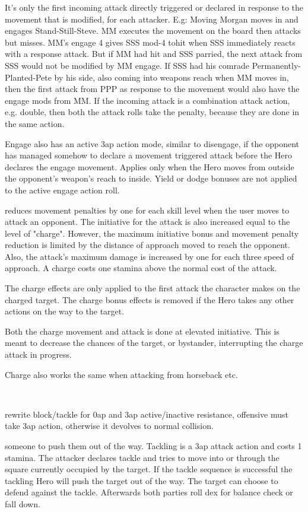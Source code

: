 It's only the first incoming attack directly triggered or declared in response to the movement that is modified, for each attacker.
E.g: Moving Morgan moves in and engages Stand-Still-Steve. MM executes the movement on the board then attacks but misses. MM's engage 4 gives SSS mod-4 tohit when SSS immediately reacts with a response attack. But if MM had hit and SSS parried, the next attack from SSS would not be modified by MM engage.
If SSS had his comrade Permanently-Planted-Pete by his side, also coming into weapons reach when MM moves in, then the first attack from PPP as response to the movement would also have the engage mods from MM.
If the incoming attack is a combination attack action, e.g. double, then both the attack rolls take the penalty, because they are done in the same action.

Engage also has an active 3ap action mode, similar to disengage, if the opponent has managed somehow to declare a movement triggered attack before the Hero declares the engage movement. Applies only when the Hero moves from outside the opponent's weapon's reach to inside.
Yield or dodge bonuses are not applied to the active engage action roll.


 reduces movement penalties by one for each skill level when the user moves to attack an opponent. The initiative for the attack is also increased equal to the level of "charge". However, the maximum initiative bonus and movement penalty reduction is limited by the distance of approach moved to reach the opponent. Also, the attack's maximum damage is increased by one for each three speed of approach. A charge costs one stamina above the normal cost of the attack.

The charge effects are only applied to the first attack the character makes on the charged target. The charge bonus effects is removed if the Hero takes any other actions on the way to the target.

Both the charge movement and attack is done at elevated initiative. This is meant to decrease the chances of the target, or bystander, interrupting the charge attack in progress.

Charge also works the same when attacking from horseback etc.


\

\closeskillslist
\todo rewrite block/tackle for 0ap and 3ap active/inactive resistance, offensive must take 3ap action, otherwise it devolves to normal collision.
\openskillslist

 someone to push them out of the way. Tackling is a 3ap attack action and costs 1 stamina. The attacker declares tackle and tries to move into or through the square currently occupied by the target. If the tackle sequence is successful the tackling Hero will push the target out of the way.
The target can choose to defend against the tackle. Afterwards both parties roll dex for balance check or fall down.


